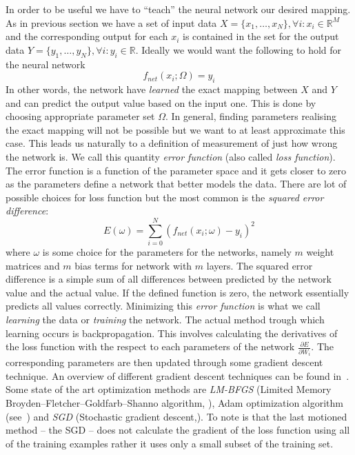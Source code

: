 \documentclass[12pt,a4paper,twoside]{scrartcl}
\numberwithin{equation}{section}
\begin{document}
In order to be useful we have to ``teach'' the neural network our desired mapping. As in previous section we have a set of input data \(X = \{x_1,\ldots , x_N\}, \forall i : x_i\in\mathbb{R}^M\) and the corresponding output for each \(x_i\) is contained in the set for the output data \(Y = \{y_1,\ldots ,y_N\}, \forall i : y_i\in\mathbb{R}\). Ideally we would want the following to hold for the neural network
\begin{equation}
  f_{net}(x_i;\Omega) = y_i
\end{equation}
In other words, the network have \emph{learned} the exact mapping between \(X\) and \(Y\) and can predict the output value based on the input one. This is done by choosing appropriate parameter set \(\Omega\). In general, finding parameters realising the exact mapping will not be possible but we want to at least approximate this case. This leads us naturally to a definition of measurement of just how wrong the network is. We call this quantity \emph{error function} (also called \emph{loss function}). The error function is a function of the parameter space and it gets closer to zero as the parameters define a network that better models the data. There are lot of possible choices for loss function but the most common is the \emph{squared error difference}:
\begin{equation}
 E(\omega) =  \sum_{i=0}^N (f_{net}(x_i;\omega) - y_i)^2
\end{equation}
where \(\omega\) is some choice for the parameters for the networks, namely \(m\) weight matrices and \(m\) bias terms for network with \(m\) layers. The squared error difference is a simple sum of all differences between predicted by the network value and the actual value. If the defined function is zero, the network essentially predicts all values correctly. Minimizing this \emph{error function} is what we call \emph{learning} the data or \emph{training} the network. The actual method trough which learning occurs is backpropagation. This involves calculating the derivatives of the loss function with the respect to each parameters of the network \(\frac{\partial E}{\partial W_i }\). The corresponding parameters are then updated through some gradient descent technique. An overview of different gradient descent techniques can be found in~\cite{ruder2016}. Some state of the art optimization methods are \emph{LM-BFGS} (Limited Memory Broyden–Fletcher–Goldfarb–Shanno algorithm, \cite{byrd1995}), Adam optimization algorithm (see~\cite{kingma2014}) and \emph{SGD} (Stochastic gradient descent,\cite{robbins1951}). To note is that the last motioned method -- the SGD -- does not calculate the gradient of the loss function using all of the training examples rather it uses only a small subset of the training set.
\end{document}
